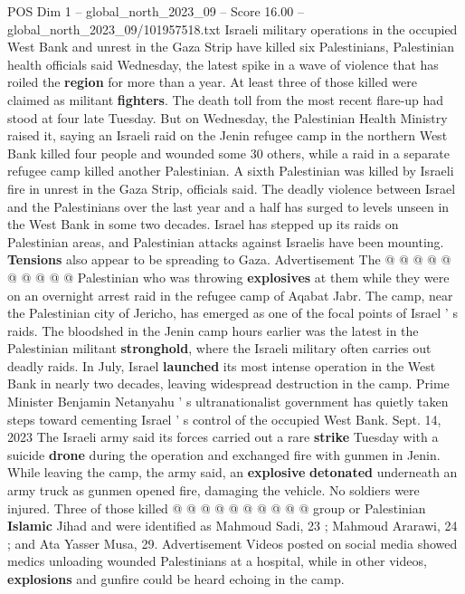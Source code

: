 \begin{textsample}{POS Dim 1 – global\_north\_2023\_09 – Score 16.00 – global\_north\_2023\_09/101957518.txt}  \label{ex:f1_pos_111}
Israeli military operations in the occupied West Bank and unrest in the Gaza Strip have killed six Palestinians, Palestinian health officials said Wednesday, the latest spike in a wave of violence that has roiled the \textbf{region} for more than a year.
At least three of those killed were claimed as militant \textbf{fighters}.
The death toll from the most recent flare-up had stood at four late Tuesday.
But on Wednesday, the Palestinian Health Ministry raised it, saying an Israeli raid on the Jenin refugee camp in the northern West Bank killed four people and wounded some 30 others, while a raid in a separate refugee camp killed another Palestinian.
A sixth Palestinian was killed by Israeli fire in unrest in the Gaza Strip, officials said.
The deadly violence between Israel and the Palestinians over the last year and a half has surged to levels unseen in the West Bank in some two decades.
Israel has stepped up its raids on Palestinian areas, and Palestinian attacks against Israelis have been mounting. \textbf{Tensions} also appear to be spreading to Gaza.
Advertisement The @ @ @ @ @ @ @ @ @ @ Palestinian who was throwing \textbf{explosives} at them while they were on an overnight arrest raid in the refugee camp of Aqabat Jabr.
The camp, near the Palestinian city of Jericho, has emerged as one of the focal points of Israel ' s raids.
The bloodshed in the Jenin camp hours earlier was the latest in the Palestinian militant \textbf{stronghold}, where the Israeli military often carries out deadly raids.
In July, Israel \textbf{launched} its most intense operation in the West Bank in nearly two decades, leaving widespread destruction in the camp.
Prime Minister Benjamin Netanyahu ' s ultranationalist government has quietly taken steps toward cementing Israel ' s control of the occupied West Bank.
Sept. 14, 2023 The Israeli army said its forces carried out a rare \textbf{strike} Tuesday with a suicide \textbf{drone} during the operation and exchanged fire with gunmen in Jenin.
While leaving the camp, the army said, an \textbf{explosive} \textbf{detonated} underneath an army truck as gunmen opened fire, damaging the vehicle.
No soldiers were injured.
Three of those killed @ @ @ @ @ @ @ @ @ @ group or Palestinian \textbf{Islamic} Jihad and were identified as Mahmoud Sadi, 23 ; Mahmoud Ararawi, 24 ; and Ata Yasser Musa, 29.
Advertisement Videos posted on social media showed medics unloading wounded Palestinians at a hospital, while in other videos, \textbf{explosions} and gunfire could be heard echoing in the camp.

\end{textsample}
